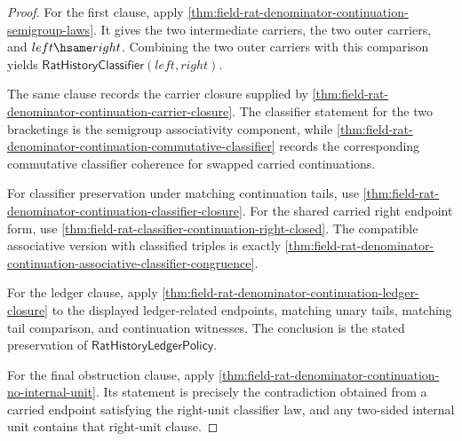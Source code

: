 \begin{proof}
For the first clause, apply
\autoref{thm:field-rat-denominator-continuation-semigroup-laws}. It gives the
two intermediate carriers, the two outer carriers, and $left\hsame right$.
Combining the two outer carriers with this comparison yields
$\mathsf{RatHistoryClassifier}(left,right)$.

The same clause records the carrier closure supplied by
\autoref{thm:field-rat-denominator-continuation-carrier-closure}. The
classifier statement for the two bracketings is the semigroup associativity
component, while
\autoref{thm:field-rat-denominator-continuation-commutative-classifier} records
the corresponding commutative classifier coherence for swapped carried
continuations.

For classifier preservation under matching continuation tails, use
\autoref{thm:field-rat-denominator-continuation-classifier-closure}. For the
shared carried right endpoint form, use
\autoref{thm:field-rat-classifier-continuation-right-closed}. The compatible
associative version with classified triples is exactly
\autoref{thm:field-rat-denominator-continuation-associative-classifier-congruence}.

For the ledger clause, apply
\autoref{thm:field-rat-denominator-continuation-ledger-closure} to the displayed
ledger-related endpoints, matching unary tails, matching tail comparison, and
continuation witnesses. The conclusion is the stated preservation of
$\mathsf{RatHistoryLedgerPolicy}$.

For the final obstruction clause, apply
\autoref{thm:field-rat-denominator-continuation-no-internal-unit}. Its statement
is precisely the contradiction obtained from a carried endpoint satisfying the
right-unit classifier law, and any two-sided internal unit contains that
right-unit clause.
\end{proof}

